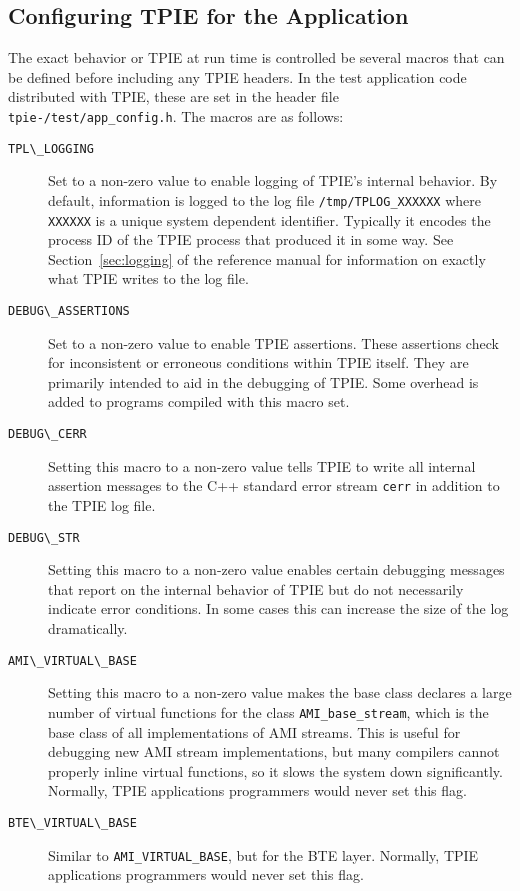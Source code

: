 \subsection{Configuring TPIE for the Application}
\label{sec:macros}

The exact behavior or TPIE at run time is controlled be several macros
that can be defined before including any TPIE headers.  In the test
application code distributed with TPIE, these
are set in the header file {\tt
  tpie-\version/test/app\_config.h}.
The macros are as follows:
\begin{description}
\item[{\verb|TPL\_LOGGING|}]  Set
  to a non-zero value to enable logging of TPIE's internal behavior.
  By default, information is logged to the log file
  \verb|/tmp/TPLOG_XXXXXX| where \verb|XXXXXX| is a unique system
  dependent identifier.  Typically it encodes the process ID of the
  TPIE process that produced it in some way.  See
  Section~\ref{sec:logging} of the reference manual for information on
  exactly what TPIE writes to the log file.
\item[{\verb|DEBUG\_ASSERTIONS|}] 
  Set to a non-zero value to enable
  TPIE assertions.  These assertions check for inconsistent or
  erroneous conditions within TPIE itself.  They are primarily
  intended to aid in the debugging of TPIE.  Some overhead is added to
  programs compiled with this macro set.
\item[{\verb|DEBUG\_CERR|}] 
   Setting this macro to a non-zero value tells
  TPIE to write all internal assertion messages to the C++ standard
  error stream \verb|cerr| in addition to the TPIE log file.
\item[{\verb|DEBUG\_STR|}] 
   
  Setting this macro to a non-zero value enables certain debugging
  messages that report on the internal behavior of TPIE but do not
  necessarily indicate error conditions.  In some cases this can
  increase the size of the log dramatically.
\item[{\verb|AMI\_VIRTUAL\_BASE|}] 
   Setting this macro to a non-zero
  value makes the base class declares a large number of virtual
  functions for the class \verb|AMI_base_stream|, which is the base
  class of all implementations of AMI streams.  This is useful for
  debugging new AMI stream implementations, but many compilers cannot
  properly inline virtual functions, so it slows the system down
  significantly.  Normally, TPIE applications programmers would never
  set this flag.
\item[{\verb|BTE\_VIRTUAL\_BASE|}] 
    Similar to
  \verb|AMI_VIRTUAL_BASE|, but for the BTE layer.
  Normally, TPIE applications programmers would never
  set this flag.


\end{description}
